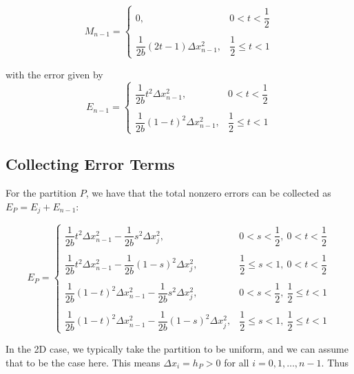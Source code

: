 \documentclass{article}
\begin{document}
\[
    M_{n-1}
    =
    \begin{cases}
        0, & 0 < t < \dfrac{1}{2}
        \\
        \\
        \dfrac{1}{2b}
        (2t - 1)
        \Delta x_{n-1}^2, & \dfrac{1}{2} \leq t < 1
    \end{cases}
\]

\noindent
with the error given by
\[
    E_{n-1}
    =
    \begin{cases}
        \dfrac{1}{2b}
        t^2
        \Delta x_{n-1}^2, & 0 < t < \dfrac{1}{2}
        \\
        \\
        \dfrac{1}{2b}
        (1 - t)^2
        \Delta x_{n-1}^2, & \dfrac{1}{2} \leq t < 1
    \end{cases}
\]

\subsection{Collecting Error Terms}

For the partition $P$, we have that the total nonzero errors can be collected as $E_P = E_j + E_{n-1}$:

\[
    E_P
    =
    \begin{cases}
        \dfrac{1}{2b}
        t^2
        \Delta x_{n-1}^2
        -
        \dfrac{1}{2b}
        s^2 \Delta x_j^2, & 0 < s < \dfrac{1}{2}, \: 0 < t < \dfrac{1}{2}
        \\
        \\
        \dfrac{1}{2b}
        t^2
        \Delta x_{n-1}^2
        -
        \dfrac{1}{2b}
        (1-s)^2 \Delta x_j^2, & \dfrac{1}{2} \leq s < 1, \: 0 < t < \dfrac{1}{2}
        \\
        \\
        \dfrac{1}{2b}
        (1 - t)^2
        \Delta x_{n-1}^2
        -
        \dfrac{1}{2b}
        s^2 \Delta x_j^2, & 0 < s < \dfrac{1}{2}, \: \dfrac{1}{2} \leq t < 1
        \\
        \\
        \dfrac{1}{2b}
        (1 - t)^2
        \Delta x_{n-1}^2
        -
        \dfrac{1}{2b}
        (1-s)^2 \Delta x_j^2, & \dfrac{1}{2} \leq s < 1, \: \dfrac{1}{2} \leq t < 1
    \end{cases}
\]

\noindent
In the 2D case, we typically take the partition to be uniform, and we can assume that to be the case here. This means $\Delta x_i = h_P > 0$ for all $i = 0, 1, \ldots, n-1$. Thus
\end{document}
